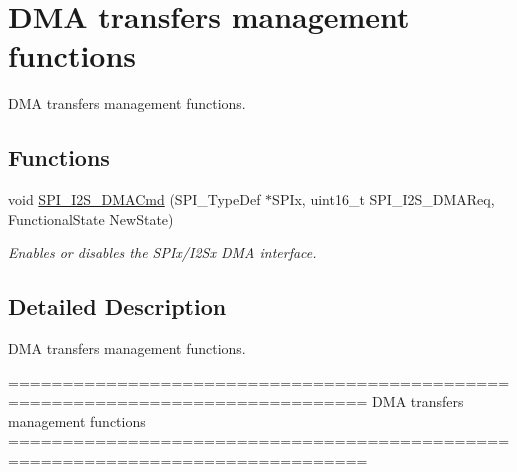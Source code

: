 \hypertarget{group___s_p_i___group4}{\section{D\-M\-A transfers management functions}
\label{group___s_p_i___group4}
}


D\-M\-A transfers management functions.  


\subsection*{Functions}
\begin{DoxyCompactItemize}
\item 
void \hyperlink{group___s_p_i___group4_gabed5b91a8576e6d578f364cc0e807e4a}{S\-P\-I\-\_\-\-I2\-S\-\_\-\-D\-M\-A\-Cmd} (S\-P\-I\-\_\-\-Type\-Def $\ast$S\-P\-Ix, uint16\-\_\-t S\-P\-I\-\_\-\-I2\-S\-\_\-\-D\-M\-A\-Req, Functional\-State New\-State)
\begin{DoxyCompactList}\small\item\em Enables or disables the S\-P\-Ix/\-I2\-Sx D\-M\-A interface. \end{DoxyCompactList}\end{DoxyCompactItemize}


\subsection{Detailed Description}
D\-M\-A transfers management functions. \begin{DoxyVerb} ===============================================================================
                         DMA transfers management functions
 ===============================================================================  \end{DoxyVerb}
 

